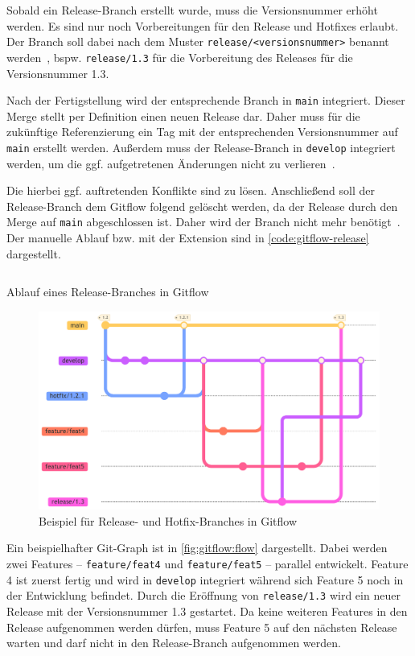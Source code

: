 Sobald ein Release\hyp Branch erstellt wurde, muss die Versionsnummer erhöht werden. Es sind nur noch Vorbereitungen für den Release und Hotfixes erlaubt. Der Branch soll dabei nach dem Muster \texttt{release/<versionsnummer>} benannt werden~\cite{driessenSuccessfulGitBranching2010}, bspw. \texttt{release/1.3} für die Vorbereitung des Releases für die Versionsnummer 1.3.

Nach der Fertigstellung wird der entsprechende Branch in \texttt{main} integriert. Dieser Merge stellt per Definition einen neuen Release dar. Daher muss für die zukünftige Referenzierung ein Tag mit der entsprechenden Versionsnummer auf \texttt{main} erstellt werden. Außerdem muss der Release-Branch in \texttt{develop} integriert werden, um die ggf. aufgetretenen Änderungen nicht zu verlieren~\cite{driessenSuccessfulGitBranching2010}.

Die hierbei ggf. auftretenden Konflikte sind zu lösen. Anschließend soll der Release-Branch dem Gitflow folgend gelöscht werden, da der Release durch den Merge auf \texttt{main} abgeschlossen ist. Daher wird der Branch nicht mehr benötigt~\cite{driessenSuccessfulGitBranching2010}. Der manuelle Ablauf bzw. mit der Extension sind in \autoref{code:gitflow-release} dargestellt.

\begin{listing}
    \inputminted[breaklines]{shell}{assets/code/gitflow/gitflow_release.sh}
    \caption{Ablauf eines Release\hyp Branches in Gitflow}
    \label{code:gitflow-release}
\end{listing}

\begin{figure}
    \includegraphics[width=0.7\linewidth]{assets/diagrams/gitflow/flow.pdf}
    \caption{Beispiel für Release- und Hotfix\hyp Branches in Gitflow}
    \label{fig:gitflow:flow}
    \Description{}
\end{figure}

Ein beispielhafter Git\hyp Graph ist in \autoref{fig:gitflow:flow} dargestellt. Dabei werden zwei Features -- \texttt{feature/feat4} und \texttt{feature/feat5} -- parallel entwickelt. Feature 4 ist zuerst fertig und wird in \texttt{develop} integriert während sich Feature 5 noch in der Entwicklung befindet. Durch die Eröffnung von \texttt{release/1.3} wird ein neuer Release mit der Versionsnummer 1.3 gestartet. Da keine weiteren Features in den Release aufgenommen werden dürfen, muss Feature 5 auf den nächsten Release warten und darf nicht in den Release\hyp Branch aufgenommen werden.

